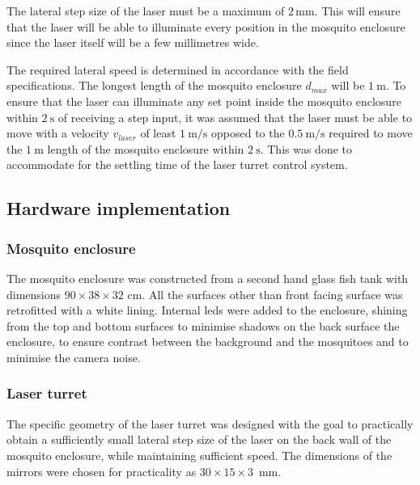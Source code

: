 \newcommand{\requiredLatStepSizeMM}{2}
The lateral step size of the laser must be a maximum of $\requiredLatStepSizeMM$\,mm. This will ensure that the laser will be able to illuminate every position in the mosquito enclosure since the laser itself will be a few millimetres wide.

\newcommand{\requiredLatSpeedMPS}{1}
The required lateral speed is determined in accordance with the field specifications. The longest length of the mosquito enclosure $d_{max}$ will be $\SI{1}{\meter}$. To ensure that the laser can illuminate any set point inside the mosquito enclosure within $\SI{2}{\second}$ of receiving a step input, it was assumed that the laser must be able to move with a velocity $v_{laser}$ of least $\SI{\requiredLatSpeedMPS}{\meter\per\second}$ opposed to the $\SI{0.5}{\meter\per\second}$ required to move the $\SI{1}{\meter}$ length of the mosquito enclosure within $\SI{2}{\second}$. This was done to accommodate for the settling time of the laser turret control system.




\subsection{Hardware implementation}



\subsubsection{Mosquito enclosure}
\newcommand{\enclosureWidthCM}{90} %
\newcommand{\enclosureHeightCM}{38} %
\newcommand{\enclosureDepthCM}{32} %

The mosquito enclosure was constructed from a second hand glass fish tank with dimensions $\enclosureWidthCM \times \enclosureHeightCM \times \enclosureDepthCM$ cm. All the surfaces other than front facing surface was retrofitted with a white lining. Internal \glspl{led} were added to the enclosure, shining from the top and bottom surfaces to minimise shadows on the back surface the enclosure, to ensure contrast between the background and the mosquitoes and to minimise the camera noise.



\subsubsection{Laser turret}
The specific geometry of the laser turret was designed with the goal to practically obtain a sufficiently small lateral step size of the laser on the back wall of the mosquito enclosure, while maintaining sufficient speed. The dimensions of the mirrors were chosen for practicality as $30 \times 15 \times 3$~mm.


